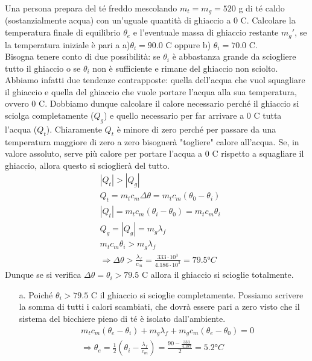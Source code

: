 \documentclass[
10pt, %
a4paper, %
oneside, %
headinclude,footinclude, %
BCOR5mm, %
]{scrartcl}
\begin{document}
\begin{exercise}
	Una persona prepara del té freddo mescolando $m_t = m_g =520$ g di té caldo (sostanzialmente acqua) con un’uguale quantità di ghiaccio a 0 \textdegree C. Calcolare la temperatura finale di equilibrio $\theta_e$ e l’eventuale massa di ghiaccio restante $m_g'$, se la temperatura iniziale è pari a a)$\theta_i = 90.0$ \textdegree C oppure b) $\theta_i = 70.0$ \textdegree C.\\
	Bisogna tenere conto di due possibilità: se $\theta_i$ è abbastanza grande da sciogliere tutto il ghiaccio o se $\theta_i$ non è sufficiente e rimane del ghiaccio non sciolto. Abbiamo infatti due tendenze contrapposte: quella dell'acqua che vuol squagliare il ghiaccio  e quella del ghiaccio che vuole portare l'acqua alla sua temperatura, ovvero 0 \textdegree C. Dobbiamo dunque calcolare il calore necessario perché il ghiaccio si sciolga completamente ($Q_g$) e quello necessario per far arrivare a 0 \textdegree C tutta l'acqua ($Q_t$). Chiaramente $Q_t$ è minore di zero perché per passare da una temperatura maggiore di zero a zero bisognerà "togliere" calore all'acqua. Se, in valore assoluto, serve più calore per portare l'acqua a 0 \textdegree C rispetto a squagliare il ghiaccio, allora questo si scioglierà del tutto. 
	\begin{align*} 
		&|Q_t| > |Q_g|\\
		&Q_t = m_t c_m \Delta\theta = m_t c_m (\theta_0-\theta_i)\\
		&|Q_t| =  m_t c_m (\theta_i-\theta_0) = m_t c_m \theta_i\\
		&Q_g = |Q_g| = m_g \lambda_f\\
		&m_t c_m \theta_i >m_g \lambda_f\\
		&\Rightarrow \Delta\theta > \frac{\lambda_f}{c_m} = \frac{333 \cdot 10^3}{4.186 \cdot 10^3} = 79.5 °C
	\end{align*} 
	Dunque se si verifica $\Delta\theta = \theta_i >79.5$ \textdegree C allora il ghiaccio si scioglie totalmente.
	\begin{itemize}
		\item[a.] Poiché $\theta_i>79.5$ \textdegree C il ghiaccio si scioglie completamente. Possiamo scrivere la somma di tutti i calori scambiati, che dovrà essere pari a zero visto che il sistema del bicchiere pieno di té è isolato dall'ambiente. 
		\begin{align*} 
			&m_t c_m (\theta_e-\theta_i) + m_g \lambda_f + m_g c_m (\theta_e-\theta_0)= 0\\
			&\Rightarrow \theta_e = \frac{1}{2}\left(\theta_i-\frac{\lambda_f}{c_m}\right) = \frac{90-\frac{333}{4.187}}{2} = 5.2 °C\\

\end{align*}
\end{itemize}
\end{exercise}
\end{document}
